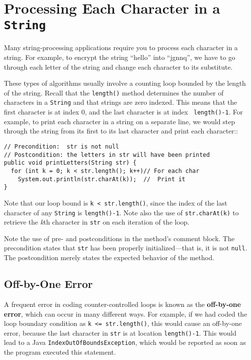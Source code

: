 \section{Processing Each Character in a {\tt String}}
\label{processing-each-characterina}
\noindent Many string-processing applications require you to process each
character in a string.  For example, to encrypt the string ``hello'' into
``jgnnq'', we have to go through each letter of the string and change
each character to its substitute.

These types of algorithms usually involve a counting loop bounded by
 the length of the string. Recall
that the {\tt length()} method determines the number of characters in
a {\tt String} and that strings are zero indexed.  This means that the
first character is at index 0, and the last character is at index {\tt
length()-1}.  For example, to print each character in a string on a
separate line, we would step through the string from its first to its
last character and print each character::

\begin{jjjlisting}[26.5pc]
\begin{lstlisting}
// Precondition:  str is not null
// Postcondition: the letters in str will have been printed
public void printLetters(String str) {
  for (int k = 0; k < str.length(); k++)// For each char
    System.out.println(str.charAt(k));  //  Print it
}
\end{lstlisting}
\end{jjjlisting}

\noindent Note that our loop bound is \verb|k < str.length()|, since
the index of the last character of any {\tt String} is
{\tt length()-1}. Note also the use of {\tt str.charAt(k)} to retrieve the
{\it k}th character in {\tt str} on each iteration of the loop.

Note the use of pre- and postconditions in the method's comment block.
The precondition states that {\tt str} has been properly
initialized---that is, it is not {\tt null}. The postcondition merely
states the expected behavior of the method.

\subsection{Off-by-One Error}
\noindent A frequent error in coding counter-controlled loops is known as the
{\bf off-by-one error}, which can occur in many different ways.  For
example, if we had coded the loop boundary condition as
\verb|k <= str.length()|, this would cause an
off-by-one error, because the last
character in {\tt str} is at location {\tt length()-1}.  This would
lead to a Java {\tt IndexOutOfBoundsException}, which would be reported
as soon as the program executed this statement.

